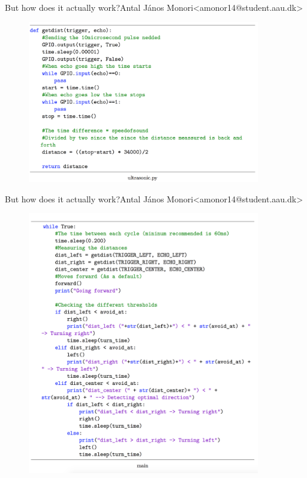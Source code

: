 \begin{frame}{But how does it actually work?}{Antal János Monori\newline<amonor14@student.aau.dk>}
	\begin{figure}[h!]
		\includegraphics[width=0.9\textwidth]{images/dissensor.png}
	\end{figure}
\end{frame}

\begin{frame}{But how does it actually work?}{Antal János Monori\newline<amonor14@student.aau.dk>}
	\begin{figure}[h!]
		\includegraphics[width=0.9\textwidth]{images/navcode.png}
	\end{figure}
\end{frame}

